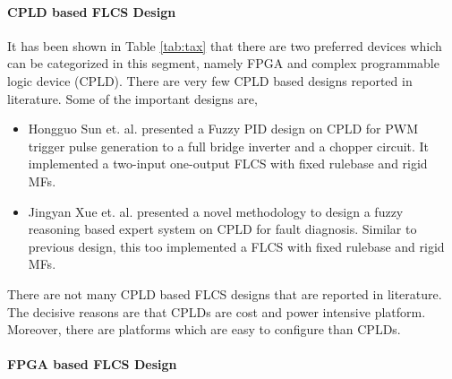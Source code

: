 \paragraph{CPLD based FLCS Design}
It has been shown in Table \ref{tab:tax} that there are two preferred devices which can be categorized in this segment, namely FPGA and complex programmable logic device (CPLD). There are very few CPLD based designs reported in literature. Some of the important designs are,
\begin{itemize}
	\item Hongguo Sun et. al. \cite{Sun2013} presented a Fuzzy PID design on CPLD for PWM trigger pulse generation to a full bridge inverter and a chopper circuit. {It implemented a two\hyp{}input one\hyp{}output FLCS with fixed rulebase and rigid MFs}.
	\item Jingyan Xue et. al. \cite{Xue2009} presented a novel methodology to design a fuzzy reasoning based expert system on CPLD for fault diagnosis. Similar to previous design,{ this too implemented a FLCS with fixed rulebase and rigid MFs.} 
\end{itemize}
There are not many CPLD based FLCS designs that are reported in literature. The decisive reasons are that CPLDs are cost and power intensive platform. Moreover, there are platforms which are easy to configure than CPLDs.

\paragraph{FPGA based FLCS Design}

